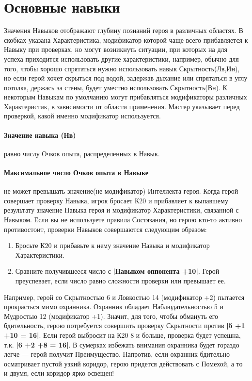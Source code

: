 \section{Основные навыки}
Значения Навыков отображают глубину познаний героя в различных областях. В скобках указана Характеристика, модификатор которой чаще всего прибавляется к Навыку при проверках, но могут возникнуть ситуации, при которых на для успеха приходится использовать другие характеристики, например, обычно для того, чтобы хорошо спрятаться нужно использовать навык Скрытность(Лв,Ин), но если герой хочет скрыться под водой, задержав дыхание или спрятаться в углу потолка, держась за стены, будет уместно использовать Скрытность(Вн). К некоторым Навыкам по умолчанию могут прибавляться модификаторы различных Характеристик, в зависимости от области применения. Мастер указывает перед проверкой, какой именно модификатор используется.
\paragraph{Значение навыка (Нв)} равно числу Очков опыта, распределенных в Навык.
\paragraph{Максимальное число Очков опыта в Навыке} не может превышать значение(не модификатор) Интеллекта героя. Когда герой совершает проверку Навыка, игрок бросает К20 и прибавляет к выпавшему результату значение Навыка героя и модификатор Характеристики, связанной с Навыком.
\newline
Если вы не используете правила Состязания, но герою кто-то активно противостоит, проверки Навыков совершаются следующим образом:
\begin{enumerate}
\item Бросьте К20 и прибавьте к нему значение Навыка и модификатор Характеристики.
\item Сравните получившееся число с \textbf{|Навыком оппонента +10|}. Герой преуспевает, если число равно сложности проверки или превышает ее.
\end{enumerate}
Например, герой со Скрытностью 6 и Ловкостью 14 (модификатор +2) пытается прокрасться мимо охранника. Охранник обладает Наблюдательностью 5 и Мудростью 12 (модификатор +1). Значит, для того, чтобы обмануть его бдительность, герою потребуется совершить проверку Скрытности против \textbf{|5 +1 +10 = 16|}. Если герой выбросит на К20 8 и больше, проверка будет успешна, т.к. \textbf{|6 +2 +8 = 16|}. В сумерках избежать внимания охранника будет гораздо легче — герой получит Преимущество. Напротив, если охранник бдительно осматривает пустой узкий коридор, герою придется действовать с Помехой, а то и двумя, если коридор ярко освещен!

